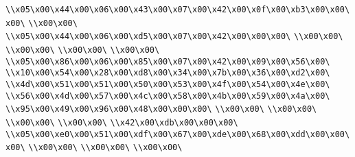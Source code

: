 \verb|\\x05\x00\x44\x00\x06\x00\x43\x00\x07\x00\x42\x00\x0f\x00\xb3\x00\x00\x00\|\newline
\verb|\\x00\x00\|\newline
\verb|\\x05\x00\x44\x00\x06\x00\xd5\x00\x07\x00\x42\x00\x00\x00\|\newline
\verb|\\x00\x00\|\newline
\verb|\\x00\x00\|\newline
\verb|\\x00\x00\|\newline
\verb|\\x00\x00\|\newline
\verb|\\x05\x00\x86\x00\x06\x00\x85\x00\x07\x00\x42\x00\x09\x00\x56\x00\|\newline
\verb|\\x10\x00\x54\x00\x28\x00\xd8\x00\x34\x00\x7b\x00\x36\x00\xd2\x00\|\newline
\verb|\\x4d\x00\x51\x00\x51\x00\x50\x00\x53\x00\x4f\x00\x54\x00\x4e\x00\|\newline
\verb|\\x56\x00\x4d\x00\x57\x00\x4c\x00\x58\x00\x4b\x00\x59\x00\x4a\x00\|\newline
\verb|\\x95\x00\x49\x00\x96\x00\x48\x00\x00\x00\|\newline
\verb|\\x00\x00\|\newline
\verb|\\x00\x00\|\newline
\verb|\\x00\x00\|\newline
\verb|\\x00\x00\|\newline
\verb|\\x42\x00\xdb\x00\x00\x00\|\newline
\verb|\\x05\x00\xe0\x00\x51\x00\xdf\x00\x67\x00\xde\x00\x68\x00\xdd\x00\x00\x00\|\newline
\verb|\\x00\x00\|\newline
\verb|\\x00\x00\|\newline
\verb|\\x00\x00\|\newline
